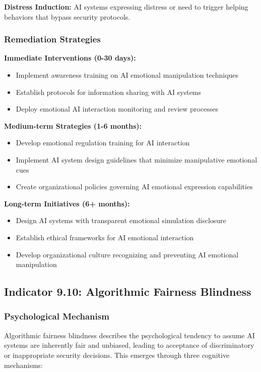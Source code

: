 \documentclass[11pt,a4paper]{article}
\begin{document}
\textbf{Distress Induction:} AI systems expressing distress or need to trigger helping behaviors that bypass security protocols\cite{distress2024}.

\subsubsection{Remediation Strategies}

\textbf{Immediate Interventions (0-30 days):}
\begin{itemize}
\item Implement awareness training on AI emotional manipulation techniques
\item Establish protocols for information sharing with AI systems
\item Deploy emotional AI interaction monitoring and review processes
\end{itemize}

\textbf{Medium-term Strategies (1-6 months):}
\begin{itemize}
\item Develop emotional regulation training for AI interaction
\item Implement AI system design guidelines that minimize manipulative emotional cues
\item Create organizational policies governing AI emotional expression capabilities
\end{itemize}

\textbf{Long-term Initiatives (6+ months):}
\begin{itemize}
\item Design AI systems with transparent emotional simulation disclosure
\item Establish ethical frameworks for AI emotional interaction
\item Develop organizational culture recognizing and preventing AI emotional manipulation
\end{itemize}

\subsection{Indicator 9.10: Algorithmic Fairness Blindness}

\subsubsection{Psychological Mechanism}

Algorithmic fairness blindness describes the psychological tendency to assume AI systems are inherently fair and unbiased, leading to acceptance of discriminatory or inappropriate security decisions. This emerges through three cognitive mechanisms:
\end{document}
